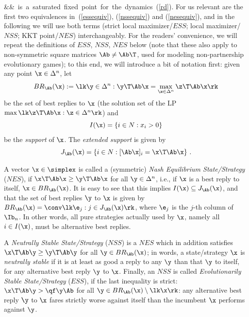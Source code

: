 \documentclass[moor]{informs3}              %
\def\reff#1{(\ref{#1})}
\def\coma#1{{#1}}
\begin{document}
\Longleftrightarrow\quad &\x &\mbox{ is a saturated fixed point for the dynamics~\reff{rd}.}\ea\rk\eeq
For us relevant are the first two equivalences in~\reff{essequiv}, \reff{nssequiv} and \reff{nesequiv}, and in the following we will use both terms (strict local maximizer/$ESS$; local maximizer/$NSS$; KKT point/$NES$) interchangeably. For the readers' convenience, we will repeat the definitions of $ESS$, $NSS$, $NES$ below (note that these also apply to non-symmetric square matrices $\Ab\neq\Ab\T$, used for modeling non-partnership evolutionary games); to this end, we will introduce a bit of notation first: given any point $\x\in\Delta^n$, \coma{let
$$BR_\Ab(\x) := \lk \y\in \Delta ^n : \y\T\Ab\x= \max_{\z\in \Delta^n} \z\T\Ab \x\rk $$
be the set of best replies to $\x$ (the solution set of the LP $\max\lk \z\T\Ab \x : \z\in \Delta^n\rk $) and}
$$I(\x)=\left\{i \in N :x_i>0 \right\}$$ be the \emph{support} of $\x$. The \emph{extended support} is given by
$$J_{\Ab}(\x)=\left \lbrace i\in N: [\Ab \x]_i = \x \T \Ab \x \right \rbrace\,.$$

A vector $\x \in \simplex$ is called a (symmetric) \emph{Nash Equilibrium State/Strategy} ($NES$), if $\x\T \Ab \x \geq \y \T \Ab \x$ for all $\y \in \Delta^n$, i.e., if $\x$ is a best reply to itself, \coma{$\x\in BR_\Ab(\x)$}. It is easy to see that this implies $I(\x)\subseteq J_{\Ab}(\x)$, and that the set \coma{of best} replies $\y$ to $\x$ is given by $BR_\Ab(\x)= \conv\lk \e_j : j\in J_{\Ab}(\x)\rk$, where $\e_j$ is the $j$-th column of $\Ib_n$. In other words, all pure strategies actually used by $\x$, namely all $i\in I(\x)$, must be alternative best replies.

A {\em Neutrally Stable State/Strategy} ($NSS$) is a $NES$ which in addition satisfies $\x \T \Ab \y \ge \y \T \Ab \y$ for all $\y\in BR_\Ab(\x)$;
in words, a state/strategy $\x$ is {\em neutrally stable} if it is at least as good a reply to any $\y$ than that $\y$ to itself, for any alternative best reply $\y$ to $\x$. Finally, an $NSS$ is called {\em Evolutionarily Stable State/Strategy} ($ESS$), if the last inequality is strict: $\x\T\Ab\y > \qf\y\Ab$ for all $\y\in BR_\Ab(\x)\setminus \lk \x\rk$: any alternative best reply $\y$ to $\x$ fares strictly worse against itself than the incumbent $\x$ performs against $\y$.
\end{document}
